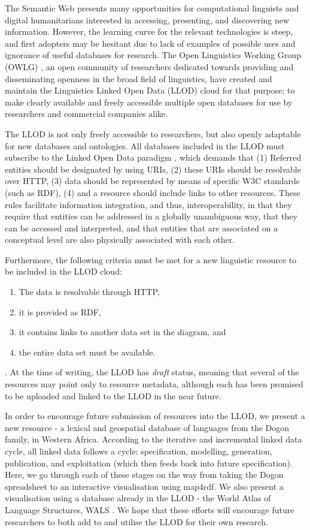 The Semantic Web presents many opportunities for computational linguists and digital humanitarians interested in accessing, presenting, and discovering new information. However, the learning curve for the relevant technologies is steep, and first adopters may be hesitant due to lack of examples of possible uses and ignorance of useful databases for research. The Open Linguistics Working Group (OWLG) \cite{owlg4lrec}, an open community of researchers dedicated towards providing and disseminating openness in the broad field of linguistics, have created and maintain the Linguistics Linked Open Data (LLOD) %
cloud for that purpose; to make clearly available and freely accessible multiple open databases for use by researchers and commercial companies alike. 

The LLOD is not only freely accessible to researchers, but also openly adaptable for new databases and ontologies. All databases included in the LLOD must subscribe to the Linked Open Data paradigm \citep{bernersLee2006_linkeddata}, which demands that (1) Referred entities should be designated by using URIs,
(2) these URIs should be resolvable over HTTP,
(3) data should be represented by means of specific W3C standards (such as RDF),
(4) and a resource should include links to other resources. These rules facilitate information integration, and thus, interoperability, in that they require that entities can be addressed in a globally unambiguous way, that they can be accessed and interpreted, and that entities that are associated on a conceptual level are also physically associated with each other. 

Furthermore, the following criteria must be met for a new linguistic resource to be included in the LLOD cloud: \begin{enumerate}\item The data is resolvable through HTTP, \item it is provided as RDF, \item it contains links to another data set in the diagram, and \item the entire data set must be available.\end{enumerate}. At the time of writing, the LLOD has {\it draft} status, meaning that several of the resources may point only to resource metadata, although each has been promised to be uploaded and linked to the LLOD in the near future. 

In order to encourage future submission of resources into the LLOD, we present a new resource - a lexical and geospatial database of languages from the Dogon family, in Western Africa. According to the iterative and incremental linked data cycle, all linked data follows a cycle: specification, modelling, generation, publication, and exploitation (which then feeds back into future specification). Here, we go through each of these stages on the way from taking the Dogon spreadsheet to an interactive visualisation using map4rdf. We also present a visualisation using a database already in the LLOD - the World Atlas of Language Structures, WALS \cite{Haspelmath_etal2008}. We hope that these efforts will encourage future researchers to both add to and utilise the LLOD for their own research.  